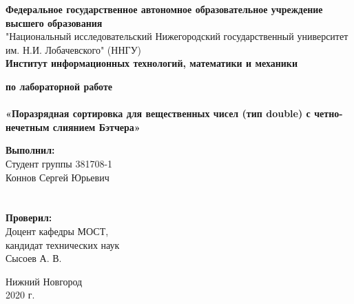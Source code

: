 \documentclass{report}
\begin{document}
    \begin{titlepage}

        \begin{center}
            \textbf{Федеральное государственное автономное образовательное учреждение высшего образования} \\
            "Национальный исследовательский Нижегородский государственный университет им. Н.И. Лобачевского" (ННГУ) \\
            \textbf{Институт информационных технологий, математики и механики}

            \vspace{\fill}

            \textbf{ по лабораторной работе \\}
            \textbf{\large\\ «Поразрядная сортировка для вещественных чисел (тип double) с четно-нечетным слиянием Бэтчера»}

            \vspace{\fill}

            \hfill\parbox{8cm}{
                \hspace*{5cm}\hspace*{-5cm}\textbf{Выполнил:} \\ Студент группы 381708-1 \\ Коннов Сергей Юрьевич \\ \\ \\
                \hspace*{5cm}\hspace*{-5cm}\textbf{Проверил:}\\ Доцент кафедры МОСТ, \\ кандидат технических наук \\ Сысоев А. В.
            }

            \vspace{\fill}

            Нижний Новгород \\ 2020 г.
        \end{center}

    \end{titlepage}
    
    \setcounter{page}{2}
    \setlength{\cftsecindent}{0em}
    \setlength{\cftsubsecindent}{1.25em}
    \setlength{\cftsubsubsecindent}{2.5em}
    \setlength{\cftsubsubsecnumwidth}{1.25em}
    \tableofcontents
\end{document}
